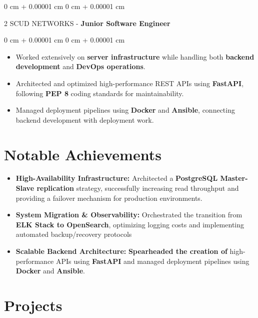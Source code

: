 \documentclass[10pt, letterpaper]{article}
\newenvironment{highlights}{ \begin{itemize}[ topsep=0.10 cm, parsep=0.10 cm, partopsep=0pt,
itemsep=0pt, leftmargin=0 cm + 10pt ] }{ \end{itemize} } %
\newenvironment{onecolentry}{ \begin{adjustwidth}{ 0 cm + 0.00001 cm }{ 0 cm + 0.00001 cm }
}{ \end{adjustwidth} } %
\newenvironment{twocolentry}[2][]{ \onecolentry \def\secondColumn{#2} \setcolumnwidth{\fill, 4.5 cm}
\begin{paracol}{2} }{ \switchcolumn \raggedleft \secondColumn \end{paracol}
\endonecolentry } %
\begin{document}
	\vspace{0.2 cm}

	\begin{twocolentry}
		{
		} SCUD NETWORKS - \textbf{Junior Software Engineer}
	\end{twocolentry}

	\vspace{0.10 cm}
	\begin{onecolentry}
		\begin{highlights}
			\item Worked extensively on \textbf{server infrastructure} while
			handling both \textbf{backend development} and \textbf{DevOps operations}.
			\item Architected and optimized high-performance REST APIs using
			\textbf{FastAPI}, following \textbf{PEP 8} coding standards for
			maintainability.
			\item Managed deployment pipelines using \textbf{Docker} and
			\textbf{Ansible}, connecting backend development with deployment work.
		\end{highlights}
	\end{onecolentry}

	\vspace{0.2 cm}

	\section*{Notable Achievements}
	\begin{itemize}
		\item \textbf{High-Availability Infrastructure:} Architected a \textbf{PostgreSQL
			Master-Slave replication} strategy, successfully increasing read
			throughput and providing a failover mechanism for production environments.

		\item \textbf{System Migration \& Observability:} Orchestrated the
			transition from \textbf{ELK Stack to OpenSearch}, optimizing logging costs
			and implementing automated backup/recovery protocols

		\item \textbf{Scalable Backend Architecture:} \textbf{Spearheaded the
			creation of} high-performance APIs using \textbf{FastAPI} and managed
			deployment pipelines using \textbf{Docker} and \textbf{Ansible}.
	\end{itemize}

	\section{Projects}
\end{document}
